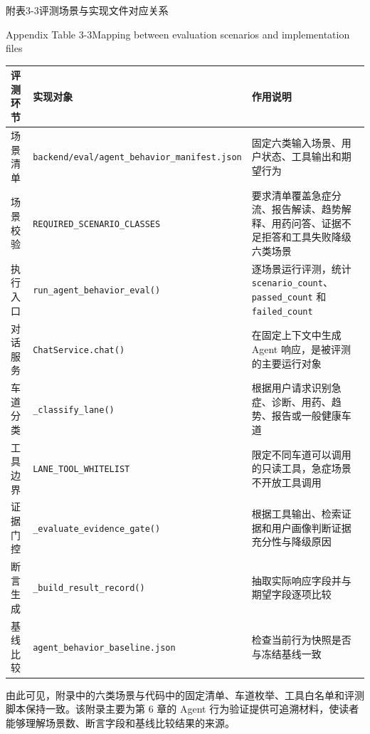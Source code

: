 \documentclass[UTF8, a4paper, 12pt, oneside]{ctexrep}
\numberwithin{equation}{chapter}
\newcommand{\codeid}[1]{{\begingroup\urlstyle{rm}\nolinkurl{#1}\endgroup}}
\begin{document}
{\vspace{0.5\baselineskip}
\begin{center}
{\songti{}附表3-3\quad 评测场景与实现文件对应关系\par}
{\rmfamily{}Appendix Table 3-3\quad Mapping between evaluation scenarios and implementation files\par}
\end{center}
\vspace{-0.5\baselineskip}
{\songti{}
\noindent\begin{tabular}{@{}>{\raggedright\arraybackslash}p{} >{\raggedright\arraybackslash}p{} >{\raggedright\arraybackslash}p{}@{}}
\toprule
评测环节 & 实现对象 & 作用说明 \\
\midrule
场景清单 & \codeid{backend/eval/agent_behavior_manifest.json} & 固定六类输入场景、用户状态、工具输出和期望行为 \\
场景校验 & \codeid{REQUIRED_SCENARIO_CLASSES} & 要求清单覆盖急症分流、报告解读、趋势解释、用药问答、证据不足拒答和工具失败降级六类场景 \\
执行入口 & \codeid{run_agent_behavior_eval()} & 逐场景运行评测，统计 \codeid{scenario_count}、\codeid{passed_count} 和 \codeid{failed_count} \\
对话服务 & \codeid{ChatService.chat()} & 在固定上下文中生成 Agent 响应，是被评测的主要运行对象 \\
车道分类 & \codeid{_classify_lane()} & 根据用户请求识别急症、诊断、用药、趋势、报告或一般健康车道 \\
工具边界 & \codeid{LANE_TOOL_WHITELIST} & 限定不同车道可以调用的只读工具，急症场景不开放工具调用 \\
证据门控 & \codeid{_evaluate_evidence_gate()} & 根据工具输出、检索证据和用户画像判断证据充分性与降级原因 \\
断言生成 & \codeid{_build_result_record()} & 抽取实际响应字段并与期望字段逐项比较 \\
基线比较 & \codeid{agent_behavior_baseline.json} & 检查当前行为快照是否与冻结基线一致 \\
\bottomrule
\end{tabular}
}

\vspace{\baselineskip}
由此可见，附录中的六类场景与代码中的固定清单、车道枚举、工具白名单和评测脚本保持一致。该附录主要为第 6 章的 Agent 行为验证提供可追溯材料，使读者能够理解场景数、断言字段和基线比较结果的来源。
\par}
\clearpage
\end{document}
